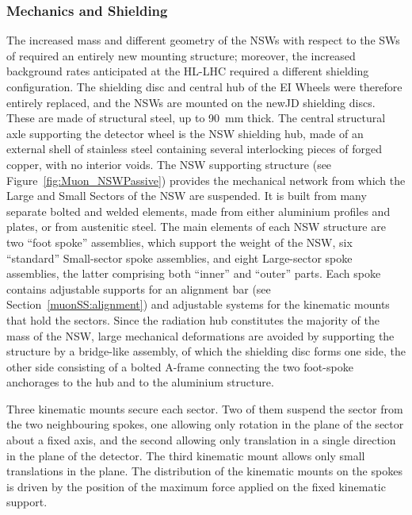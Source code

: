 \documentclass[cernpreprint, atlasdraft=false, UKenglish,british,orcidlogo, texmf, orcidlogo]{atlasdoc}
\begin{document}
\subsubsection{Mechanics and Shielding \label{muonSS:shielding}} 
The increased mass and different geometry of the \glspl{NSW} with respect to the \glspl{SW} of \RunOneTwo required an entirely new mounting structure; moreover, the increased background rates anticipated at the \gls{HL-LHC} required a different shielding configuration.
The shielding disc and central hub of the EI Wheels were therefore entirely replaced, and the \glspl{NSW} are mounted on the \gls{newJD} shielding discs. 
These are made of structural steel, up to \SI{90}{\mm} thick.
The central structural axle supporting the detector wheel is the \gls{NSW} shielding hub, made of an external shell of stainless steel containing several interlocking pieces of forged copper, with no interior voids.
The \gls{NSW} supporting structure (see Figure~\ref{fig:Muon_NSWPassive}) provides the mechanical network from which the Large and Small Sectors of the \gls{NSW} are suspended.
It is built from many separate bolted and welded elements, made from either aluminium profiles and plates, or from austenitic steel.
The main elements of each \gls{NSW} structure are two ``foot spoke'' assemblies, which support the weight of the \gls{NSW}, six ``standard'' Small-sector spoke assemblies, and eight Large-sector spoke assemblies, the latter comprising both ``inner'' and ``outer'' parts.
Each spoke contains adjustable supports for an alignment bar (see Section~\ref{muonSS:alignment}) and adjustable systems for the kinematic mounts that hold the sectors.
Since the radiation hub constitutes the majority of the mass of the \gls{NSW}, large mechanical deformations are avoided by supporting the structure by a bridge-like assembly, of which the shielding disc forms one side, the other side consisting of a bolted A-frame connecting the two foot-spoke anchorages to the hub and to the aluminium structure. 
 
Three kinematic mounts secure each sector. Two of them suspend the sector from the two neighbouring spokes, one 
allowing only rotation in the plane of the sector about a fixed axis, and the second 
allowing only translation in a single direction in the plane of the detector.
The third kinematic mount 
allows only small translations in the plane.
The distribution of the kinematic mounts on the spokes is driven by the position of the maximum force applied on the fixed kinematic support.
 
\end{document}
